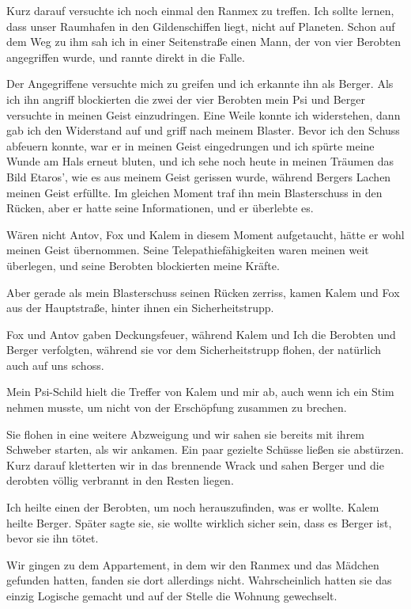 \documentclass[11pt]{scrartcl}
\begin{document}
Kurz darauf versuchte ich noch einmal den Ranmex zu treffen. Ich sollte
lernen, dass unser Raumhafen in den Gildenschiffen liegt, nicht auf
Planeten. Schon auf dem Weg zu ihm sah ich in einer Seitenstraße einen
Mann, der von vier Berobten angegriffen wurde, und rannte direkt in die
Falle.

Der Angegriffene versuchte mich zu greifen und ich erkannte ihn als
Berger. Als ich ihn angriff blockierten die zwei der vier Berobten mein
Psi und Berger versuchte in meinen Geist einzudringen. Eine Weile konnte
ich widerstehen, dann gab ich den Widerstand auf und griff nach meinem
Blaster. Bevor ich den Schuss abfeuern konnte, war er in meinen Geist
eingedrungen und ich spürte meine Wunde am Hals erneut bluten, und ich
sehe noch heute in meinen Träumen das Bild Etaros', wie es aus meinem
Geist gerissen wurde, während Bergers Lachen meinen Geist erfüllte. Im
gleichen Moment traf ihn mein Blasterschuss in den Rücken, aber er hatte
seine Informationen, und er überlebte es.

Wären nicht Antov, Fox und Kalem in diesem Moment aufgetaucht, hätte er
wohl meinen Geist übernommen. Seine Telepathiefähigkeiten waren meinen
weit überlegen, und seine Berobten blockierten meine Kräfte.

Aber gerade als mein Blasterschuss seinen Rücken zerriss, kamen Kalem
und Fox aus der Hauptstraße, hinter ihnen ein Sicherheitstrupp.

Fox und Antov gaben Deckungsfeuer, während Kalem und Ich die Berobten
und Berger verfolgten, während sie vor dem Sicherheitstrupp flohen, der
natürlich auch auf uns schoss.

Mein Psi-Schild hielt die Treffer von Kalem und mir ab, auch wenn ich
ein Stim nehmen musste, um nicht von der Erschöpfung zusammen zu
brechen.

Sie flohen in eine weitere Abzweigung und wir sahen sie bereits mit
ihrem Schweber starten, als wir ankamen. Ein paar gezielte Schüsse
ließen sie abstürzen. Kurz darauf kletterten wir in das brennende Wrack
und sahen Berger und die derobten völlig verbrannt in den Resten liegen.

Ich heilte einen der Berobten, um noch herauszufinden, was er wollte.
Kalem heilte Berger. Später sagte sie, sie wollte wirklich sicher sein,
dass es Berger ist, bevor sie ihn tötet.

Wir gingen zu dem Appartement, in dem wir den Ranmex und das Mädchen
gefunden hatten, fanden sie dort allerdings nicht. Wahrscheinlich hatten
sie das einzig Logische gemacht und auf der Stelle die Wohnung
gewechselt.
\end{document}
